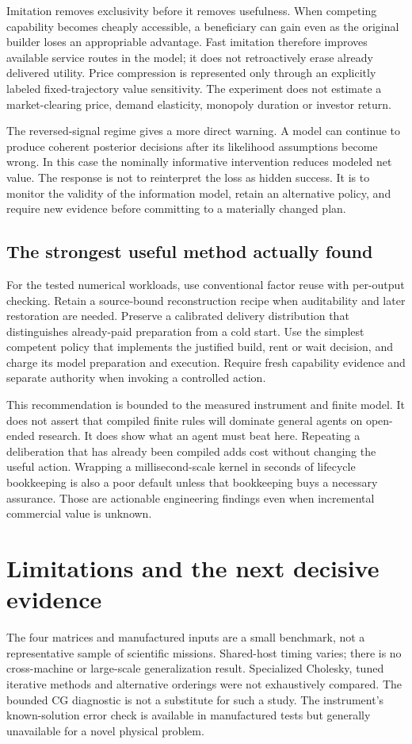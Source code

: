 Imitation removes exclusivity before it removes usefulness. When competing capability becomes cheaply accessible, a beneficiary can gain even as the original builder loses an appropriable advantage. Fast imitation therefore improves available service routes in the model; it does not retroactively erase already delivered utility. Price compression is represented only through an explicitly labeled fixed-trajectory value sensitivity. The experiment does not estimate a market-clearing price, demand elasticity, monopoly duration or investor return.

The reversed-signal regime gives a more direct warning. A model can continue to produce coherent posterior decisions after its likelihood assumptions become wrong. In this case the nominally informative intervention reduces modeled net value. The response is not to reinterpret the loss as hidden success. It is to monitor the validity of the information model, retain an alternative policy, and require new evidence before committing to a materially changed plan.

\subsection{The strongest useful method actually found}
For the tested numerical workloads, use conventional factor reuse with per-output checking. Retain a source-bound reconstruction recipe when auditability and later restoration are needed. Preserve a calibrated delivery distribution that distinguishes already-paid preparation from a cold start. Use the simplest competent policy that implements the justified build, rent or wait decision, and charge its model preparation and execution. Require fresh capability evidence and separate authority when invoking a controlled action.

This recommendation is bounded to the measured instrument and finite model. It does not assert that compiled finite rules will dominate general agents on open-ended research. It does show what an agent must beat here. Repeating a deliberation that has already been compiled adds cost without changing the useful action. Wrapping a millisecond-scale kernel in seconds of lifecycle bookkeeping is also a poor default unless that bookkeeping buys a necessary assurance. Those are actionable engineering findings even when incremental commercial value is unknown.

\section{Limitations and the next decisive evidence}
The four matrices and manufactured inputs are a small benchmark, not a representative sample of scientific missions. Shared-host timing varies; there is no cross-machine or large-scale generalization result. Specialized Cholesky, tuned iterative methods and alternative orderings were not exhaustively compared. The bounded CG diagnostic is not a substitute for such a study. The instrument's known-solution error check is available in manufactured tests but generally unavailable for a novel physical problem.

